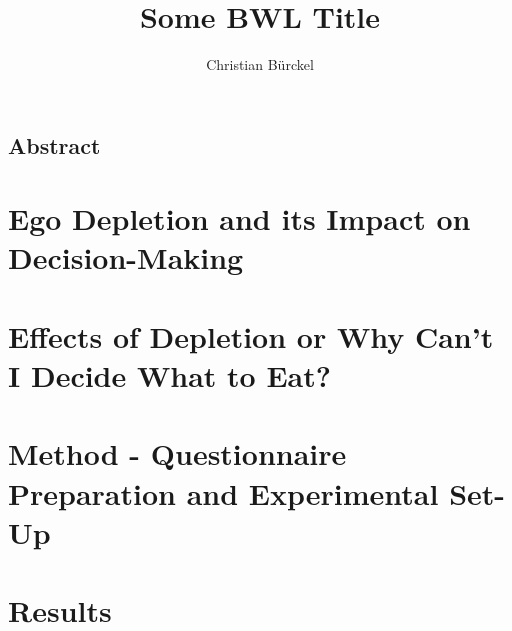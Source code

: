 
\author{Christian Bürckel}
\title{Some BWL Title}




\maketitle
%
 \thispagestyle{plain} %
 \clearpage
 \thispagestyle{empty}
 \mbox{}
 \clearpage
 \pagestyle{bib} %
 \tableofcontents
 \clearpage
 \pagestyle{abstract}
 \section*{Abstract}
  
 \clearpage
 \pagestyle{main}
 \chapter{Ego Depletion and its Impact on Decision-Making}
  
 \chapter{Effects of Depletion or Why Can't I Decide What to Eat?}\label{chap:effectsofegodepletion}
  
 \chapter{Method - Questionnaire Preparation and Experimental Set-Up}
 
 \chapter{Results}
 
%
\clearpage
\pagestyle{bib}
%
%

